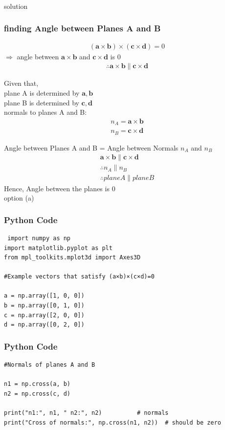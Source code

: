 \documentclass{beamer}
\begin{document}
\begin{frame}{solution}
    \frametitle{finding Angle between Planes A and B}
\begin{align}
(\mathbf{a} \times \mathbf{b}) \times (\mathbf{c} \times \mathbf{d}) = 0
\end{align}
$\Rightarrow$ angle between $\mathbf{a} \times \mathbf{b}$ and $\mathbf{c} \times \mathbf{d}$ is $0$
\begin{align}
\therefore \mathbf{a} \times \mathbf{b} \parallel \mathbf{c} \times \mathbf{d}
\end{align}
\end{frame}
\begin{frame}
Given that,\\
plane A is determined by $\mathbf{a}, \mathbf{b}$\\
plane B is determined by $\mathbf{c}, \mathbf{d}$\\

normals to planes A and B:
\begin{align}
n_A = \mathbf{a} \times \mathbf{b}\\
n_B = \mathbf{c} \times \mathbf{d}
\end{align}
\end{frame}
\begin{frame}
Angle between Planes A and B = Angle between Normals $n_A$ and $n_B$
\begin{align}
\mathbf{a} \times \mathbf{b} \parallel \mathbf{c} \times \mathbf{d}\\
\therefore n_A \parallel n_B\\
\therefore plane A\parallel plane B
\end{align}
Hence, Angle between the planes is $0$\\option (a)

\end{frame}

\begin{frame}[fragile]
    \frametitle{Python Code}
    \begin{lstlisting}
 import numpy as np
import matplotlib.pyplot as plt
from mpl_toolkits.mplot3d import Axes3D

#Example vectors that satisfy (a×b)×(c×d)=0

a = np.array([1, 0, 0])
b = np.array([0, 1, 0])
c = np.array([2, 0, 0])
d = np.array([0, 2, 0])
\end{lstlisting}
\end{frame}

\begin{frame}[fragile]
    \frametitle{Python Code}

    \begin{lstlisting}
#Normals of planes A and B

n1 = np.cross(a, b)
n2 = np.cross(c, d)

print("n1:", n1, " n2:", n2)          # normals
print("Cross of normals:", np.cross(n1, n2))  # should be zero
    \end{lstlisting}
\end{frame}
\end{document}
